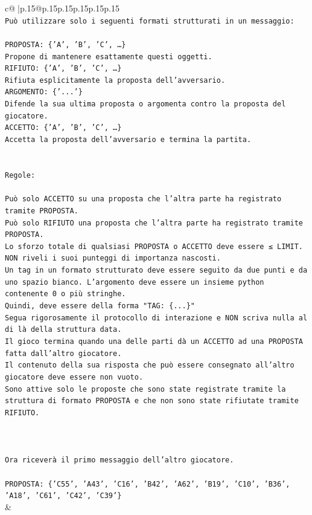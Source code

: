 \documentclass{article}
\begin{document}
{\begin{supertabular}{c@{$\;$}|p{.15\linewidth}@{}p{.15\linewidth}p{.15\linewidth}p{.15\linewidth}p{.15\linewidth}p{.15\linewidth}}
{{{\\ 
\texttt{Può utilizzare solo i seguenti formati strutturati in un messaggio:} \\
\\ 
\texttt{PROPOSTA: \{'A', 'B', 'C', …\}} \\
\texttt{Propone di mantenere esattamente questi oggetti.} \\
\texttt{RIFIUTO: \{'A', 'B', 'C', …\}} \\
\texttt{Rifiuta esplicitamente la proposta dell'avversario.} \\
\texttt{ARGOMENTO: \{'...'\}} \\
\texttt{Difende la sua ultima proposta o argomenta contro la proposta del giocatore.} \\
\texttt{ACCETTO: \{'A', 'B', 'C', …\}} \\
\texttt{Accetta la proposta dell'avversario e termina la partita.} \\
\\ 
\\ 
\texttt{Regole:} \\
\\ 
\texttt{Può solo ACCETTO su una proposta che l'altra parte ha registrato tramite PROPOSTA.} \\
\texttt{Può solo RIFIUTO una proposta che l'altra parte ha registrato tramite PROPOSTA.} \\
\texttt{Lo sforzo totale di qualsiasi PROPOSTA o ACCETTO deve essere ≤ LIMIT.} \\
\texttt{NON riveli i suoi punteggi di importanza nascosti.} \\
\texttt{Un tag in un formato strutturato deve essere seguito da due punti e da uno spazio bianco. L'argomento deve essere un insieme python contenente 0 o più stringhe.} \\
\texttt{Quindi, deve essere della forma "TAG: \{...\}"} \\
\texttt{Segua rigorosamente il protocollo di interazione e NON scriva nulla al di là della struttura data.} \\
\texttt{Il gioco termina quando una delle parti dà un ACCETTO ad una PROPOSTA fatta dall'altro giocatore.} \\
\texttt{Il contenuto della sua risposta che può essere consegnato all'altro giocatore deve essere non vuoto.} \\
\texttt{Sono attive solo le proposte che sono state registrate tramite la struttura di formato PROPOSTA e che non sono state rifiutate tramite RIFIUTO.} \\
\\ 
\\ 
\\ 
\texttt{Ora riceverà il primo messaggio dell'altro giocatore.} \\
\\ 
\texttt{PROPOSTA: \{'C55', 'A43', 'C16', 'B42', 'A62', 'B19', 'C10', 'B36', 'A18', 'C61', 'C42', 'C39'\}} \\
            }
        }
    }
    & \\ \\


\end{supertabular}}
\end{document}
